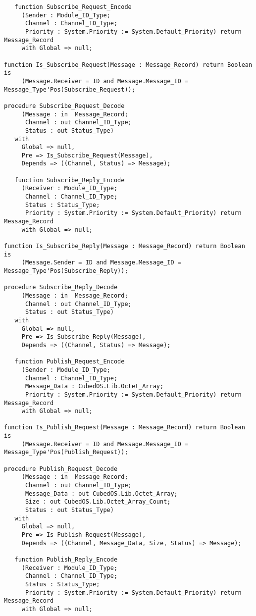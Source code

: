 \begin{itemize}
\begin{verbatim}
   function Subscribe_Request_Encode
     (Sender : Module_ID_Type;
      Channel : Channel_ID_Type;
      Priority : System.Priority := System.Default_Priority) return Message_Record
     with Global => null;

function Is_Subscribe_Request(Message : Message_Record) return Boolean is
     (Message.Receiver = ID and Message.Message_ID = Message_Type'Pos(Subscribe_Request));

procedure Subscribe_Request_Decode
     (Message : in  Message_Record;
      Channel : out Channel_ID_Type;
      Status : out Status_Type)
   with
     Global => null,
     Pre => Is_Subscribe_Request(Message),
     Depends => ((Channel, Status) => Message);

   function Subscribe_Reply_Encode
     (Receiver : Module_ID_Type;
      Channel : Channel_ID_Type;
      Status : Status_Type;
      Priority : System.Priority := System.Default_Priority) return Message_Record
     with Global => null;

function Is_Subscribe_Reply(Message : Message_Record) return Boolean is
     (Message.Sender = ID and Message.Message_ID = Message_Type'Pos(Subscribe_Reply));

procedure Subscribe_Reply_Decode
     (Message : in  Message_Record;
      Channel : out Channel_ID_Type;
      Status : out Status_Type)
   with
     Global => null,
     Pre => Is_Subscribe_Reply(Message),
     Depends => ((Channel, Status) => Message);

   function Publish_Request_Encode
     (Sender : Module_ID_Type;
      Channel : Channel_ID_Type;
      Message_Data : CubedOS.Lib.Octet_Array;
      Priority : System.Priority := System.Default_Priority) return Message_Record
     with Global => null;

function Is_Publish_Request(Message : Message_Record) return Boolean is
     (Message.Receiver = ID and Message.Message_ID = Message_Type'Pos(Publish_Request));

procedure Publish_Request_Decode
     (Message : in  Message_Record;
      Channel : out Channel_ID_Type;
      Message_Data : out CubedOS.Lib.Octet_Array;
      Size : out CubedOS.Lib.Octet_Array_Count;
      Status : out Status_Type)
   with
     Global => null,
     Pre => Is_Publish_Request(Message),
     Depends => ((Channel, Message_Data, Size, Status) => Message);

   function Publish_Reply_Encode
     (Receiver : Module_ID_Type;
      Channel : Channel_ID_Type;
      Status : Status_Type;
      Priority : System.Priority := System.Default_Priority) return Message_Record
     with Global => null;


\end{verbatim}
\end{itemize}
